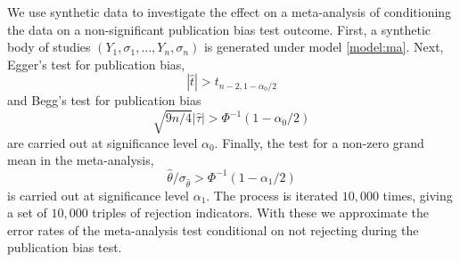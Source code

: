 \documentclass[12pt]{article}
\newcommand{\y}{Y}
\renewcommand{\t}{t}
\newcommand{\comment}[1]{
  \iftoggle{commenttoggle}{
    {\normalsize{\color{red}{ #1}}\normalsize}
  }
  {}
}
\begin{document}
We use synthetic data to investigate the effect on a meta-analysis of
conditioning the data on a non-significant publication bias test
outcome. First, a synthetic body of studies
$(\y_1,\sigma_1,\ldots,\y_n,\sigma_n)$ is generated under model
\eqref{model:ma}. Next, Egger's test for publication bias,
$$
|\hat\t|>t_{n-2,1-\alpha_0/2}
$$ and Begg's test for publication bias
$$
\sqrt{9n/4}|\hat\tau| > \Phi^{-1}(1-\alpha_0/2)
$$
are carried out at significance level $\alpha_{0}$. Finally, the test
for a non-zero grand mean in the meta-analysis,
$$
\hat\theta/\sigma_{\hat\theta} > \Phi^{-1}(1-\alpha_1/2)
$$
is carried out at significance level $\alpha_1$. The process is
iterated $10,000$ times, giving a set of $10,000$\comment{finalize these reps} triples of rejection
indicators. With these we approximate the error rates of the
meta-analysis test conditional on not rejecting during the publication bias
test.
\end{document}

